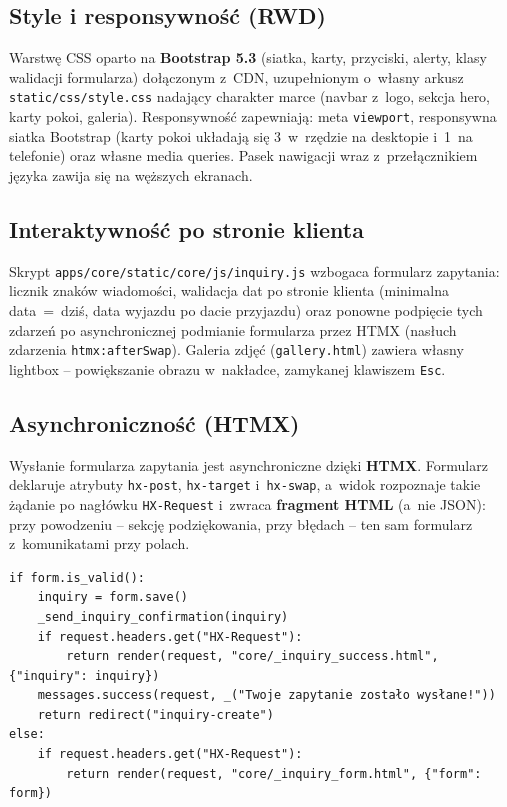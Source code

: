 \documentclass[12pt,a4paper]{article}
\begin{document}
\subsection{Style i responsywność (RWD)}

Warstwę CSS oparto na \textbf{Bootstrap 5.3} (siatka, karty, przyciski, alerty,
klasy walidacji formularza) dołączonym z~CDN, uzupełnionym o~własny arkusz
\texttt{static/css/style.css} nadający charakter marce (navbar z~logo, sekcja hero,
karty pokoi, galeria). Responsywność zapewniają: meta \texttt{viewport}, responsywna
siatka Bootstrap (karty pokoi układają się 3~w~rzędzie na desktopie i~1~na telefonie)
oraz własne media queries. Pasek nawigacji wraz z~przełącznikiem języka zawija się
na węższych ekranach.

\subsection{Interaktywność po stronie klienta}

Skrypt \texttt{apps/core/static/core/js/inquiry.js} wzbogaca formularz zapytania:
licznik znaków wiadomości, walidacja dat po stronie klienta (minimalna data~=~dziś,
data wyjazdu po dacie przyjazdu) oraz ponowne podpięcie tych zdarzeń po
asynchronicznej podmianie formularza przez HTMX (nasłuch zdarzenia
\texttt{htmx:afterSwap}). Galeria zdjęć (\texttt{gallery.html}) zawiera własny
lightbox -- powiększanie obrazu w~nakładce, zamykanej klawiszem \texttt{Esc}.

\subsection{Asynchroniczność (HTMX)}

Wysłanie formularza zapytania jest asynchroniczne dzięki \textbf{HTMX}. Formularz
deklaruje atrybuty \texttt{hx-post}, \texttt{hx-target} i~\texttt{hx-swap}, a~widok
rozpoznaje takie żądanie po nagłówku \texttt{HX-Request} i~zwraca \textbf{fragment
HTML} (a~nie JSON): przy powodzeniu -- sekcję podziękowania, przy błędach -- ten sam
formularz z~komunikatami przy polach.

\begin{lstlisting}[style=pythonstyle, caption={Rozgałęzienie odpowiedzi dla żądania HTMX (views/inquiries.py)}]
if form.is_valid():
    inquiry = form.save()
    _send_inquiry_confirmation(inquiry)
    if request.headers.get("HX-Request"):
        return render(request, "core/_inquiry_success.html", {"inquiry": inquiry})
    messages.success(request, _("Twoje zapytanie zostało wysłane!"))
    return redirect("inquiry-create")
else:
    if request.headers.get("HX-Request"):
        return render(request, "core/_inquiry_form.html", {"form": form})
\end{lstlisting}
\end{document}
